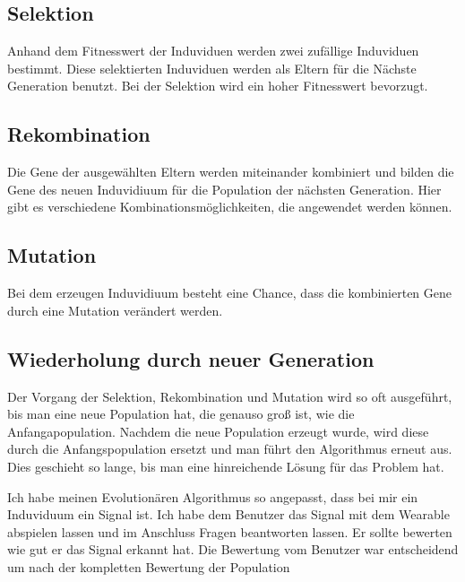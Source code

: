 \subsection{Selektion}
\label{ch:Grundlagen:sec:Selektion}
Anhand dem Fitnesswert der Induviduen werden zwei zufällige Induviduen bestimmt. Diese selektierten Induviduen werden als Eltern für die Nächste Generation benutzt.
Bei der Selektion wird ein hoher Fitnesswert bevorzugt.

\subsection{Rekombination}
\label{ch:Grundlagen:sec:Rekombination}
Die Gene der ausgewählten Eltern werden miteinander kombiniert und bilden die Gene des neuen Induvidiuum für die Population der nächsten Generation. Hier gibt es verschiedene Kombinationsmöglichkeiten, die angewendet werden können.

\subsection{Mutation}
\label{ch:Grundlagen:sec:Mutation}
Bei dem erzeugen Induvidiuum besteht eine Chance, dass die kombinierten Gene durch eine Mutation verändert werden. 

\subsection{Wiederholung durch neuer Generation}
\label{ch:Grundlagen:sec:Wiederholung durch neuer Generation}
Der Vorgang der Selektion, Rekombination und Mutation wird so oft ausgeführt, bis man eine neue Population hat, die genauso groß ist, wie die Anfangapopulation.
Nachdem die neue Population erzeugt wurde, wird diese durch die Anfangspopulation ersetzt und man führt den Algorithmus erneut aus. 
Dies geschieht so lange, bis man eine hinreichende Lösung für das Problem hat. 




Ich habe meinen Evolutionären Algorithmus so angepasst, dass bei mir ein Induviduum ein Signal ist. 
Ich habe dem Benutzer das Signal mit dem Wearable abspielen lassen und im Anschluss Fragen beantworten lassen. 
Er sollte bewerten wie gut er das Signal erkannt hat. Die Bewertung vom Benutzer war entscheidend um nach der kompletten Bewertung der Population 
